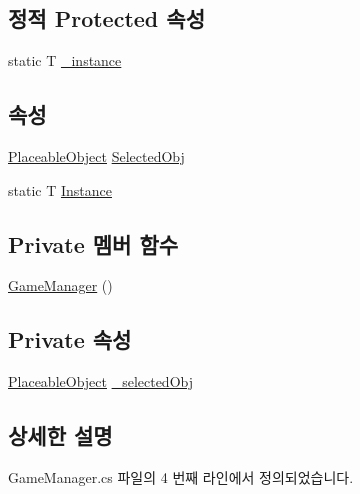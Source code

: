 \subsection*{정적 Protected 속성}
\begin{DoxyCompactItemize}
\item 
static T \hyperlink{class_m_c_n_1_1_singletone_a267e8a9e6e7c073b988cda4f95e26eb1}{\+\_\+instance}
\end{DoxyCompactItemize}
\subsection*{속성}
\begin{DoxyCompactItemize}
\item 
\hyperlink{class_placeable_object}{Placeable\+Object} \hyperlink{class_game_manager_afe043cc0216cce9ef00ddff0413e6edf}{Selected\+Obj}
\item 
static T \hyperlink{class_m_c_n_1_1_singletone_a46dbbebd93e96a9592a9803c51f35602}{Instance}
\end{DoxyCompactItemize}
\subsection*{Private 멤버 함수}
\begin{DoxyCompactItemize}
\item 
\hyperlink{class_game_manager_aba36fa5d78b798e6707bd23c5ee55f19}{Game\+Manager} ()
\end{DoxyCompactItemize}
\subsection*{Private 속성}
\begin{DoxyCompactItemize}
\item 
\hyperlink{class_placeable_object}{Placeable\+Object} \hyperlink{class_game_manager_a91b01fa0f592596b6129866dedccd015}{\+\_\+selected\+Obj}
\end{DoxyCompactItemize}


\subsection{상세한 설명}


Game\+Manager.\+cs 파일의 4 번째 라인에서 정의되었습니다.



